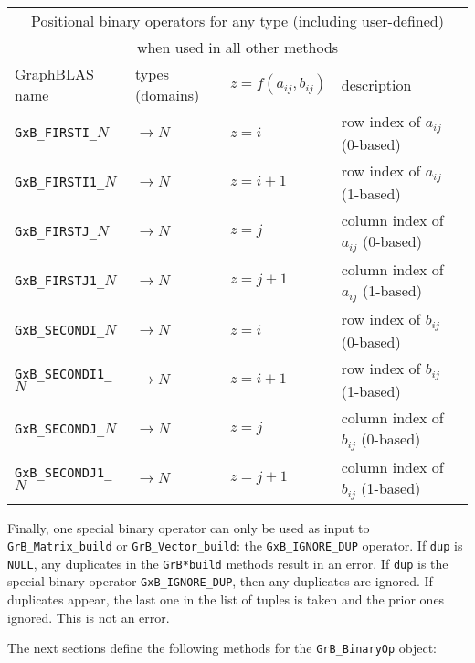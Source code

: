 \documentclass[12pt]{article}
\begin{document}
{\vspace{0.2in}
{\footnotesize
\begin{tabular}{|llll|}
\hline
\multicolumn{4}{|c|}{Positional binary operators for any type (including user-defined)} \\
\multicolumn{4}{|c|}{when used in all other methods} \\
\hline
GraphBLAS name            & types (domains)   & $z=f(a_{ij},b_{ij})$      & description \\
\hline
\verb'GxB_FIRSTI_'$N$    & $ \rightarrow N$  & $z = i$       & row index of $a_{ij}$ (0-based) \\
\verb'GxB_FIRSTI1_'$N$   & $ \rightarrow N$  & $z = i+1$     & row index of $a_{ij}$ (1-based) \\
\verb'GxB_FIRSTJ_'$N$    & $ \rightarrow N$  & $z = j$       & column index of $a_{ij}$ (0-based) \\
\verb'GxB_FIRSTJ1_'$N$   & $ \rightarrow N$  & $z = j+1$     & column index of $a_{ij}$ (1-based) \\
\verb'GxB_SECONDI_'$N$   & $ \rightarrow N$  & $z = i$       & row index of $b_{ij}$ (0-based) \\
\verb'GxB_SECONDI1_'$N$  & $ \rightarrow N$  & $z = i+1$     & row index of $b_{ij}$ (1-based) \\
\verb'GxB_SECONDJ_'$N$   & $ \rightarrow N$  & $z = j$       & column index of $b_{ij}$ (0-based) \\
\verb'GxB_SECONDJ1_'$N$  & $ \rightarrow N$  & $z = j+1$     & column index of $b_{ij}$ (1-based) \\
\hline
\end{tabular}
}
\vspace{0.2in}

Finally, one special binary operator can only be used as input to
\verb'GrB_Matrix_build' or \verb'GrB_Vector_build': the \verb'GxB_IGNORE_DUP'
operator.  If \verb'dup' is \verb'NULL', any duplicates in the \verb'GrB*build'
methods result in an error.  If \verb'dup' is the special binary operator
\verb'GxB_IGNORE_DUP', then any duplicates are ignored.  If duplicates appear,
the last one in the list of tuples is taken and the prior ones ignored.  This
is not an error.

The next sections define the following methods for the \verb'GrB_BinaryOp'
object:

}
\end{document}
